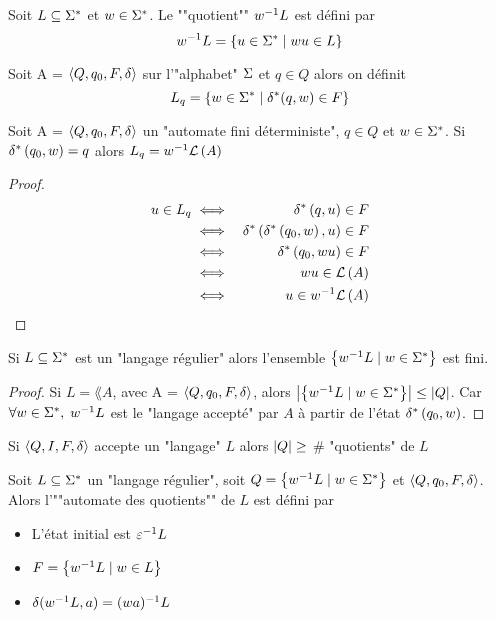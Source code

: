 \begin{definition}
	Soit $L \subseteq \Sigma^{*}$ et $w \in \Sigma^{*}$. Le ""quotient"" $w^{-1} L$ est défini par
	$$ w^{-1} L = \left\{u \in \Sigma^{*} \mid wu \in L\right\} $$
\end{definition}

\begin{definition}
	Soit A = $\langle Q, q_0, F, \delta \rangle$ sur l'"alphabet" $\Sigma$ et $q \in Q$ alors on définit
	$$ L_q = \left\{w \in \Sigma^{*} \mid \delta^{*} (q,w) \in F\right\} $$
\end{definition}


\begin{lemma}
	Soit A = $\langle Q, q_0, F, \delta \rangle$ un "automate fini déterministe", $q \in Q$ et $w \in \Sigma^{*}$. Si $\delta^{*} \left(q_0,w\right) = q$ alors
	$L_q = w^{-1} \mathcal{L}\left(A\right)$
\end{lemma}

\begin{proof}
	\begin{eqnarray*}
		u \in L_q &\iff& \delta^{*} \left(q,u\right) \in F \\
		&\iff& \delta^{*} \left(\delta^{*} \left(q_0,w\right),u\right) \in F \\
		&\iff& \delta^{*} \left(q_0,wu\right) \in F \\
		&\iff& wu \in \mathcal{L}\left(A\right) \\
		&\iff& u \in w^{-1} \mathcal{L}\left(A\right)
	\end{eqnarray*}
\end{proof}

\begin{coro}
	Si $L \subseteq \Sigma^{*}$ est un "langage régulier" alors l'ensemble $\left\{w^{-1} L \mid w \in \Sigma^{*}\right\}$ est fini.
\end{coro}

\begin{proof}
	Si $L = \lang A$, avec A = $\langle Q, q_0, F, \delta \rangle$, alors $\left|\left\{w^{-1} L \mid w \in \Sigma^{*}\right\}\right| \leq \left|Q\right|$. Car $\forall w \in \Sigma^{*},$ $w^{-1} L$ est
	le "langage accepté" par $A$ à partir de l'état $\delta^{*} \left(q_0,w\right)$.
\end{proof}

\begin{coro} \label{coro:2}
	Si $\langle Q, I, F, \delta \rangle$ accepte un "langage" $L$ alors $\left|Q\right| \geq $ \# "quotients" de $L$
\end{coro}

\begin{definition} 

	Soit $L \subseteq \Sigma^{*}$ un "langage régulier", soit $Q = \left\{w^{-1} L \mid w \in \Sigma^{*}\right\}$ et $\langle Q, q_0, F, \delta \rangle$. Alors l'""automate des quotients"" de $L$
	est défini par
	\begin{itemize}
		\item L'état initial est $\varepsilon^{-1} L$
		\item $F = \left\{w^{-1} L \mid w \in L\right\}$
		\item $\delta (w^{-1} L, a) = (wa)^{-1} L$
	\end{itemize}
\end{definition}

